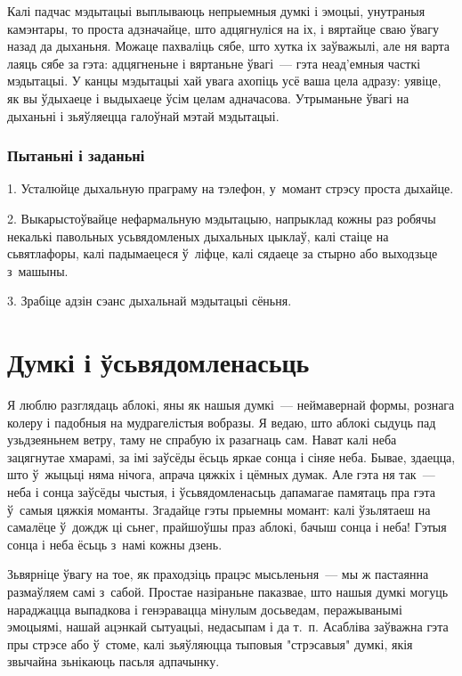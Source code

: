 Калі падчас мэдытацыі выплываюць непрыемныя думкі і эмоцыі, унутраныя камэнтары, то проста адзначайце, што адцягнуліся на іх, і вяртайце сваю ўвагу назад да дыханьня. Можаце пахваліць сябе, што хутка іх заўважылі, але ня варта лаяць сябе за гэта: адцягненьне і вяртаньне ўвагі~--- гэта неад'емныя часткі мэдытацыі. У канцы мэдытацыі хай увага ахопіць усё ваша цела адразу: уявіце, як вы ўдыхаеце і выдыхаеце ўсім целам адначасова. Утрыманьне ўвагі на дыханьні і зьяўляецца галоўнай мэтай мэдытацыі.

\subsubsection{Пытаньні і заданьні}

1. Усталюйце дыхальную праграму на тэлефон, у~момант стрэсу проста дыхайце.

2. Выкарыстоўвайце нефармальную мэдытацыю, напрыклад кожны раз робячы некалькі павольных усьвядомленых дыхальных цыклаў, калі стаіце на сьвятлафоры, калі падымаецеся ў~ліфце, калі сядаеце за стырно або выходзьце з~машыны.

3. Зрабіце адзін сэанс дыхальнай мэдытацыі сёньня.


\section{Думкі і ўсьвядомленасьць}

Я люблю разглядаць аблокі, яны як нашыя думкі~--- неймавернай формы, рознага колеру і падобныя на мудрагелістыя вобразы. Я ведаю, што аблокі сыдуць пад узьдзеяньнем ветру, таму не спрабую іх разагнаць сам. Нават калі неба зацягнутае хмарамі, за імі заўсёды ёсьць яркае сонца і сіняе неба. Бывае, здаецца, што ў~жыцьці няма нічога, апрача цяжкіх і цёмных думак. Але гэта ня так~--- неба і сонца заўсёды чыстыя, і ўсьвядомленасьць дапамагае памятаць пра гэта ў~самыя цяжкія моманты. Згадайце гэты прыемны момант: калі ўзьлятаеш на самалёце ў~дождж ці сьнег, прайшоўшы праз аблокі, бачыш сонца і неба! Гэтыя сонца і неба ёсьць з~намі кожны дзень.

Зьвярніце ўвагу на тое, як праходзіць працэс мысьленьня~--- мы ж пастаянна размаўляем самі з~сабой. Простае назіраньне паказвае, што нашыя думкі могуць нараджацца выпадкова і генэравацца мінулым досьведам, перажыванымі эмоцыямі, нашай ацэнкай сытуацыі, недасыпам і да т.~п. Асабліва заўважна гэта пры стрэсе або ў~стоме, калі зьяўляюцца тыповыя "стрэсавыя" думкі, якія звычайна зьнікаюць пасьля адпачынку.

